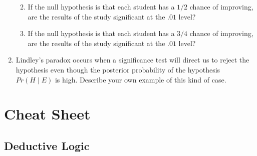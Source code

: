 \documentclass[justified]{tufte-book}
\providecommand{\tightlist}{%
  \setlength{\itemsep}{0pt}\setlength{\parskip}{0pt}}
\newcommand{\given}{\mid}
\newcommand{\p}{Pr}
\theoremstyle{definition}
\theoremstyle{definition}
\theoremstyle{definition}
\theoremstyle{definition}
\theoremstyle{remark}
\begin{document}
\begin{enumerate}
  \begin{enumerate}
  \def\labelenumii{\alph{enumii}.}
  \tightlist
  \item
    If the null hypothesis is that each student has a \(1/2\) chance of improving, are the results of the study significant at the \(.01\) level?
  \item
    If the null hypothesis is that each student has a \(3/4\) chance of improving, are the results of the study significant at the \(.01\) level?
  \end{enumerate}
\item
  Lindley's paradox occurs when a significance test will direct us to reject the hypothesis even though the posterior probability of the hypothesis \(\p(H \given E)\) is high. Describe your own example of this kind of case.
\end{enumerate}

\hypertarget{appendix-appendix}{%
\appendix}


\hypertarget{cheat-sheet}{%
\chapter{Cheat Sheet}\label{cheat-sheet}}

\hypertarget{deductive-logic}{%
\section*{Deductive Logic}\label{deductive-logic}}
\end{document}
